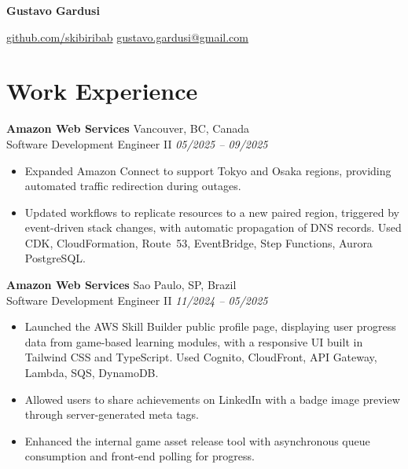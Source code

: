 \documentclass[a4paper,10pt]{article}
\begin{document}
\begin{center}
    {\LARGE\textbf{Gustavo Gardusi}}\\[0.75em]
    {\small
    \begin{minipage}{0.85\textwidth}
        \href{https://github.com/skibiribab}{github.com/skibiribab}
        \hfill
        \href{mailto:gustavo.gardusi@gmail.com}{gustavo.gardusi@gmail.com}
    \end{minipage}}
\end{center}

\section*{Work Experience}

\textbf{Amazon Web Services}
    \hfill Vancouver, BC, Canada\\
Software Development Engineer II
    \hfill \textit{05/2025 -- 09/2025}
\begin{itemize}
    \item Expanded Amazon Connect to support Tokyo and Osaka regions, providing automated traffic redirection during outages.
    \item Updated workflows to replicate resources to a new paired region, triggered by event-driven stack changes, with automatic propagation of DNS records. Used CDK, CloudFormation, Route~53, EventBridge, Step Functions, Aurora PostgreSQL.
\end{itemize}

\textbf{Amazon Web Services}
    \hfill Sao Paulo, SP, Brazil\\
Software Development Engineer II
    \hfill \textit{11/2024 -- 05/2025}
\begin{itemize}
    \item Launched the AWS Skill Builder public profile page, displaying user progress data from game-based learning modules, with a responsive UI built in Tailwind CSS and TypeScript. Used Cognito, CloudFront, API Gateway, Lambda, SQS, DynamoDB.
    \item Allowed users to share achievements on LinkedIn with a badge image preview through server-generated meta tags.
    \item Enhanced the internal game asset release tool with asynchronous queue consumption and front-end polling for progress.
\end{itemize}
\end{document}
